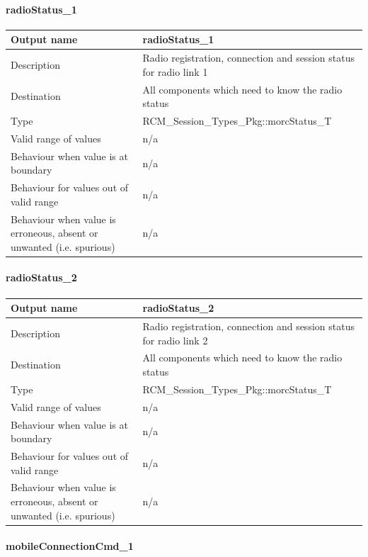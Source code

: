 \paragraph{radioStatus\_1}

\begin{longtable}{p{}p{}}
\toprule
Output name				& radioStatus\_1 \\
\midrule
Description				& Radio registration, connection and session status for radio link 1 \\
\midrule
Destination				& All components which need to know the radio status \\ 
\midrule
Type					& RCM\_Session\_Types\_Pkg::morcStatus\_T \\
\midrule
Valid range of values	& n/a \\
\midrule
Behaviour when value is at boundary	& n/a \\
\midrule
Behaviour for values out of valid range	& n/a \\
\midrule
Behaviour when value is erroneous, absent or unwanted (i.e. spurious) & n/a \\
\bottomrule
\end{longtable}

\paragraph{radioStatus\_2}

\begin{longtable}{p{}p{}}
	\toprule
	Output name				& radioStatus\_2 \\
	\midrule
	Description				& Radio registration, connection and session status for radio link 2 \\
	\midrule
	Destination				& All components which need to know the radio status \\ 
	\midrule
	Type					& RCM\_Session\_Types\_Pkg::morcStatus\_T \\
	\midrule
	Valid range of values	& n/a \\
	\midrule
	Behaviour when value is at boundary	& n/a \\
	\midrule
	Behaviour for values out of valid range	& n/a \\
	\midrule
	Behaviour when value is erroneous, absent or unwanted (i.e. spurious) & n/a \\
	\bottomrule
\end{longtable}

\paragraph{mobileConnectionCmd\_1}

